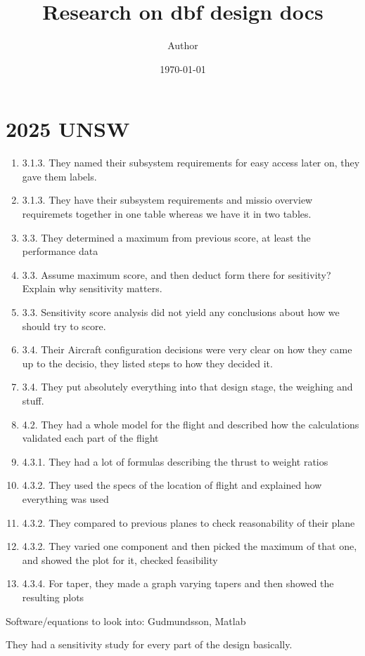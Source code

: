\documentclass{article}
\title{Research on dbf design docs}
\author{Author}
\date{\today}
\begin{document}
\maketitle

\section{2025 UNSW}

\begin{enumerate}
	\item 3.1.3. They named their subsystem requirements for easy access later on, they gave them labels. 
	\item 3.1.3. They have their subsystem requirements and missio overview requiremets together in one table whereas we have it in two tables. 
	\item 3.3. They determined a maximum from previous score, at least the performance data
	\item 3.3. Assume maximum score, and then deduct form there for sesitivity? Explain why sensitivity matters. 
	\item 3.3. Sensitivity score analysis did not yield any conclusions about how we should try to score. 
	\item 3.4. Their Aircraft configuration decisions were very clear on how they came up to the decisio, they listed steps to how they decided it.
	\item 3.4. They put absolutely everything into that design stage, the weighing and stuff.
	\item 4.2. They had a whole model for the flight and described how the calculations validated each part of the flight
	\item 4.3.1. They had a lot of formulas describing the thrust to weight ratios
	\item 4.3.2. They used the specs of the location of flight and explained how everything was used
	\item 4.3.2. They compared to previous planes to check reasonability of their plane
	\item 4.3.2. They varied one component and then picked the maximum of that one, and showed the plot for it, checked feasibility
	\item 4.3.4. For taper, they made a graph varying tapers and then showed the resulting plots
\end{enumerate}

Software/equations to look into: Gudmundsson, Matlab

They had a sensitivity study for every part of the design basically. 
\end{document}
